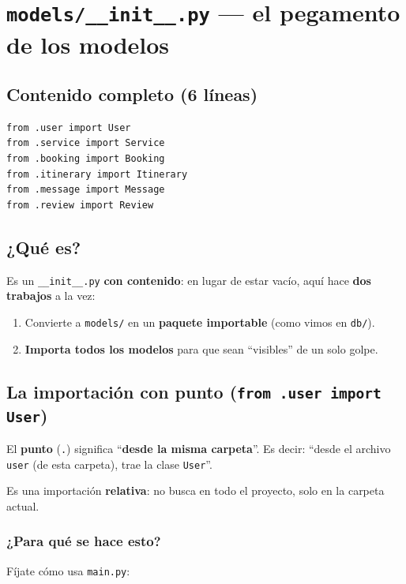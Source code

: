 \documentclass[11pt,a4paper]{article}
\begin{document}
\section{\texttt{models/\_\_init\_\_.py} --- el pegamento de los modelos}

\subsection{Contenido completo (6 líneas)}

\begin{lstlisting}
from .user import User
from .service import Service
from .booking import Booking
from .itinerary import Itinerary
from .message import Message
from .review import Review
\end{lstlisting}

\subsection{¿Qué es?}

Es un \texttt{\_\_init\_\_.py} \textbf{con contenido}: en lugar de estar vacío, aquí hace
\textbf{dos trabajos} a la vez:
\begin{enumerate}
    \item Convierte a \texttt{models/} en un \textbf{paquete importable} (como vimos en \texttt{db/}).
    \item \textbf{Importa todos los modelos} para que sean ``visibles'' de un solo golpe.
\end{enumerate}

\subsection{La importación con punto (\texttt{from .user import User})}

El \textbf{punto} (\texttt{.}) significa ``\textbf{desde la misma carpeta}''. Es decir:
``desde el archivo \texttt{user} (de esta carpeta), trae la clase \texttt{User}''.

Es una importación \textbf{relativa}: no busca en todo el proyecto, solo en la carpeta actual.

\subsubsection{¿Para qué se hace esto?}

Fíjate cómo usa \texttt{main.py}:
\end{document}
